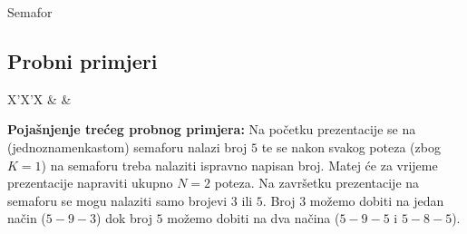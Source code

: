 \begin{statement}[
  problempoints=100,
  timelimit=1 sekunda,
  memorylimit=512 MiB,
]{Semafor}
\subsection*{Probni primjeri}
\begin{tabularx}{\textwidth}{X'X'X}
 &
 &
\end{tabularx}

\textbf{Pojašnjenje trećeg probnog primjera:}
Na početku prezentacije se na (jednoznamenkastom) semaforu nalazi broj $5$ te se
nakon svakog poteza (zbog $K = 1$) na semaforu treba nalaziti ispravno
napisan broj. Matej će za vrijeme prezentacije napraviti ukupno $N=2$ poteza.
Na završetku prezentacije na semaforu se mogu nalaziti samo brojevi $3$ ili
$5$.  Broj $3$ možemo dobiti na jedan način ($5-9-3$) dok broj $5$ možemo
dobiti na dva načina ($5-9-5$ i $5-8-5$).

\end{statement}

